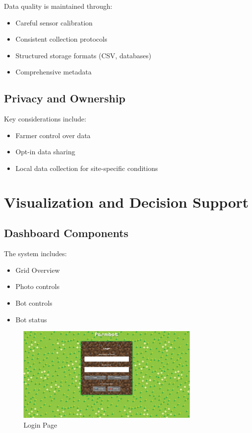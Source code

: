 Data quality is maintained through:
\begin{itemize}
\item Careful sensor calibration
\item Consistent collection protocols
\item Structured storage formats (CSV, databases)
\item Comprehensive metadata
\end{itemize}

\subsection{Privacy and Ownership}

Key considerations include:
\begin{itemize}
\item Farmer control over data
\item Opt-in data sharing
\item Local data collection for site-specific conditions
\end{itemize}

\section{Visualization and Decision Support}

\subsection{Dashboard Components}

The system includes:
\begin{itemize}
\item Grid Overview
\item Photo controls
\item Bot controls
\item Bot status
\end{itemize}

\begin{figure}[H]
    \centering
    \includegraphics[width=0.8\textwidth]{img/login_page.png}
    \caption{Login Page}
    \label{fig:dashboard_login_page}
\end{figure}

